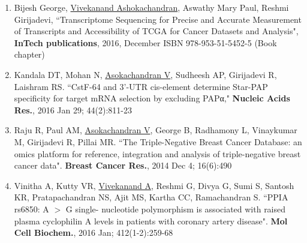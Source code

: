 \documentclass[a4paper, 10pt]{article}
\begin{document}
\begin{enumerate}
  \item Bijesh George, \underline{Vivekanand Ashokachandran}, Aswathy Mary Paul, Reshmi Girijadevi, ``Transcriptome Sequencing for Precise and Accurate Measurement of Transcripts and Accessibility of TCGA for Cancer Datasets and Analysis", \textbf{InTech publications}, 2016, December ISBN 978-953-51-5452-5 (Book chapter)
  \item Kandala DT, Mohan N, \underline{Asokachandran V}, Sudheesh AP, Girijadevi R, Laishram RS. ``CstF-64 and 3'-UTR cis-element determine Star-PAP specificity for target mRNA selection by excluding PAPα," \textbf{Nucleic Acids Res.}, 2016 Jan 29; 44(2):811-23
  \item Raju R, Paul AM, \underline{Asokachandran V}, George B, Radhamony L, Vinaykumar M, Girijadevi R, Pillai MR. ``The Triple-Negative Breast Cancer Database: an omics platform for reference, integration and analysis of triple-negative breast cancer data". \textbf{Breast Cancer Res.}, 2014 Dec 4; 16(6):490
  \item Vinitha A, Kutty VR, \underline{Vivekanand A}, Reshmi G, Divya G, Sumi S, Santosh KR, Pratapachandran NS, Ajit MS, Kartha CC, Ramachandran S. ``PPIA rs6850: A $>$ G single- nucleotide polymorphism is associated with raised plasma cyclophilin A levels in patients with coronary artery disease". \textbf{Mol Cell Biochem.}, 2016 Jan; 412(1-2):259-68
\end{enumerate}



%   
%   

\vfill

\footnotesize
\end{document}
